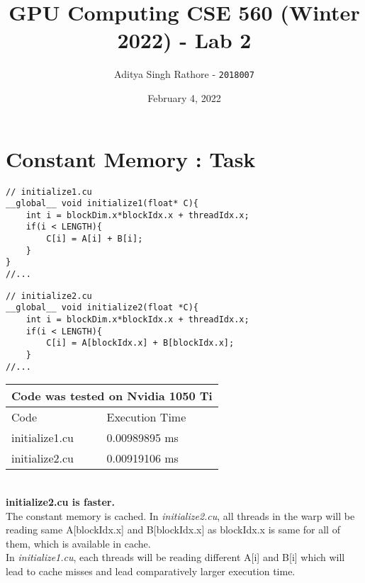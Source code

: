 \documentclass[11pt, oneside]{article}   	%
\begin{document}
\title{GPU Computing CSE 560 (Winter 2022) - Lab 2} 
\author{Aditya Singh Rathore - \texttt{2018007}}
\date{February 4, 2022}							%


\maketitle

\section*{Constant Memory : Task}

\begin{lstlisting}
// initialize1.cu
__global__ void initialize1(float* C){
    int i = blockDim.x*blockIdx.x + threadIdx.x;
    if(i < LENGTH){
        C[i] = A[i] + B[i];
    }
}
//...
\end{lstlisting}

\begin{lstlisting}
// initialize2.cu
__global__ void initialize2(float *C){
    int i = blockDim.x*blockIdx.x + threadIdx.x;
    if(i < LENGTH){
        C[i] = A[blockIdx.x] + B[blockIdx.x];
    }
//...
\end{lstlisting}
\begin{tabular}{ |p{3cm}||p{3cm}|  }
 \hline
 \multicolumn{2}{|c|}{Code was tested on Nvidia 1050 Ti} \\
 \hline
 Code & Execution Time\\
 \hline
 initialize1.cu   & 0.00989895 ms\\
 initialize2.cu   & 0.00919106 ms\\
 \hline
\end{tabular} \\
\textbf{initialize2.cu is faster. }\\
The constant memory is cached. In \emph{initialize2.cu}, all threads in the warp will be reading same A[blockIdx.x] and B[blockIdx.x] as blockIdx.x is same for all of them, which is available in cache. 
\\
In \emph{initialize1.cu}, each threads will be reading different A[i] and B[i] which will lead to cache misses and lead comparatively larger execution time.
\end{document}
